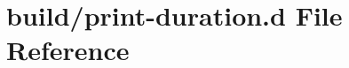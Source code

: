\hypertarget{print-duration_8d}{}\section{build/print-\/duration.d File Reference}
\label{print-duration_8d}
